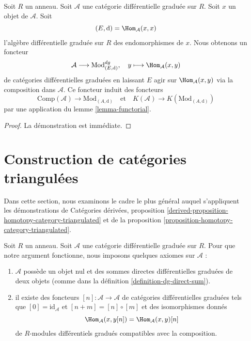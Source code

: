 \begin{lemma}
\label{lemma-construction}
Soit $R$ un anneau. Soit $\mathcal{A}$ une catégorie différentielle
graduée sur $R$. Soit $x$ un objet de $\mathcal{A}$. Soit
$$
(E, \text{d}) = \Hom_\mathcal{A}(x, x)
$$
l'algèbre différentielle graduée sur $R$ des endomorphismes de $x$.
Nous obtenons un foncteur
$$
\mathcal{A} \longrightarrow \text{Mod}^{dg}_{(E, \text{d})},\quad
y \longmapsto \Hom_\mathcal{A}(x, y)
$$
de catégories différentielles graduées en laissant $E$ agir
sur $\Hom_\mathcal{A}(x, y)$ via la composition dans $\mathcal{A}$.
Ce foncteur induit des foncteurs
$$
\text{Comp}(\mathcal{A}) \to \text{Mod}_{(A, \text{d})}
\quad\text{et}\quad
K(\mathcal{A}) \to K(\text{Mod}_{(A, \text{d})})
$$
par une application du lemme \ref{lemma-functorial}.
\end{lemma}

\begin{proof}
La démonstration est immédiate.
\end{proof}









\section{Construction de catégories triangulées}
\label{section-review}

\noindent
Dans cette section, nous examinons le cadre le plus général auquel s'appliquent
les démonstrations de Catégories dérivées,
proposition
\ref{derived-proposition-homotopy-category-triangulated} et de la proposition \ref{proposition-homotopy-category-triangulated}.

\medskip\noindent
Soit $R$ un anneau. Soit $\mathcal{A}$ une catégorie différentielle graduée sur
$R$. Pour que notre argument fonctionne, nous imposons quelques axiomes sur $\mathcal{A}$ :
\begin{enumerate}
\item[(A)] $\mathcal{A}$ possède un objet nul et des sommes
directes différentielles graduées de deux
objets (comme dans la définition
\ref{definition-dg-direct-sum}). \item[(B)] il existe des foncteurs $[n] : \mathcal{A} \longrightarrow
\mathcal{A}$ de catégories différentielles graduées tels que
$[0] = \text{id}_\mathcal{A}$ et $[n + m] = [n] \circ [m]$ et des
isomorphismes donnés
$$
\Hom_\mathcal{A}(x, y[n]) = \Hom_\mathcal{A}(x, y)[n]
$$
de $R$-modules différentiels gradués compatibles avec la composition.
\end{enumerate}

